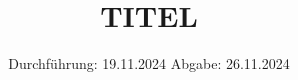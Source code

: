

\subject{VERSUCH NUMMER}
\title{TITEL}
\date{%
  Durchführung: 19.11.2024
  \hspace{3em}
  Abgabe: 26.11.2024
}



\maketitle
\thispagestyle{empty}
\tableofcontents
\newpage






\printbibliography{}



